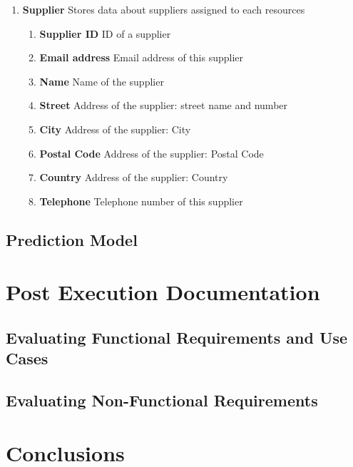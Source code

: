 \documentclass[a4paper,11pt,twoside]{report}
\theoremstyle{definition}
\begin{document}
\begin{enumerate}
\item \textbf{Supplier} Stores data about suppliers assigned to each resources
\begin{enumerate}
\item \textbf{Supplier ID} ID of a supplier
\item \textbf{Email address} Email address of this supplier
\item \textbf{Name} Name of the supplier
\item \textbf{Street} Address of the supplier: street name and number
\item \textbf{City} Address of the supplier: City
\item \textbf{Postal Code} Address of the supplier: Postal Code
\item \textbf{Country} Address of the supplier: Country
\item \textbf{Telephone} Telephone number of this supplier
\end{enumerate}

\end{enumerate}
 
\section{Prediction Model}




\chapter{Post Execution Documentation}



\section{Evaluating Functional Requirements and Use Cases}

\section{Evaluating Non-Functional Requirements}




\chapter*{Conclusions}
\end{document}
